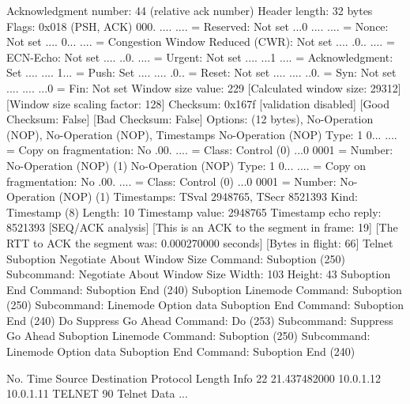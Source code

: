     Acknowledgment number: 44    (relative ack number)
    Header length: 32 bytes
    Flags: 0x018 (PSH, ACK)
        000. .... .... = Reserved: Not set
        ...0 .... .... = Nonce: Not set
        .... 0... .... = Congestion Window Reduced (CWR): Not set
        .... .0.. .... = ECN-Echo: Not set
        .... ..0. .... = Urgent: Not set
        .... ...1 .... = Acknowledgment: Set
        .... .... 1... = Push: Set
        .... .... .0.. = Reset: Not set
        .... .... ..0. = Syn: Not set
        .... .... ...0 = Fin: Not set
    Window size value: 229
    [Calculated window size: 29312]
    [Window size scaling factor: 128]
    Checksum: 0x167f [validation disabled]
        [Good Checksum: False]
        [Bad Checksum: False]
    Options: (12 bytes), No-Operation (NOP), No-Operation (NOP), Timestamps
        No-Operation (NOP)
            Type: 1
                0... .... = Copy on fragmentation: No
                .00. .... = Class: Control (0)
                ...0 0001 = Number: No-Operation (NOP) (1)
        No-Operation (NOP)
            Type: 1
                0... .... = Copy on fragmentation: No
                .00. .... = Class: Control (0)
                ...0 0001 = Number: No-Operation (NOP) (1)
        Timestamps: TSval 2948765, TSecr 8521393
            Kind: Timestamp (8)
            Length: 10
            Timestamp value: 2948765
            Timestamp echo reply: 8521393
    [SEQ/ACK analysis]
        [This is an ACK to the segment in frame: 19]
        [The RTT to ACK the segment was: 0.000270000 seconds]
        [Bytes in flight: 66]
Telnet
    Suboption Negotiate About Window Size
        Command: Suboption (250)
        Subcommand: Negotiate About Window Size
            Width: 103
            Height: 43
    Suboption End
        Command: Suboption End (240)
    Suboption Linemode
        Command: Suboption (250)
        Subcommand: Linemode
            Option data
    Suboption End
        Command: Suboption End (240)
    Do Suppress Go Ahead
        Command: Do (253)
        Subcommand: Suppress Go Ahead
    Suboption Linemode
        Command: Suboption (250)
        Subcommand: Linemode
            Option data
    Suboption End
        Command: Suboption End (240)

No.     Time           Source                Destination           Protocol Length Info
     22 21.437482000   10.0.1.12             10.0.1.11             TELNET   90     Telnet Data ...

